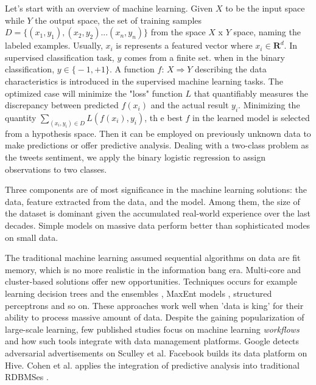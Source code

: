 \documentclass[sigconf]{acmart}
\begin{document}
Let's start with an overview of machine learning. Given $X$ to be the input space while $Y$ the output space, the set of training samples $D = \big\{ (x_1, y_1), (x_2, y_2)...(x_n, y_n) \big\} $ from the space $X$ x $Y$ space, naming the labeled examples. Usually, $x_i$ is represents a featured vector where $x_i \in \mathbf{R}^d$. In supervised classification task, $y$ comes from a finite set. when in the binary classification, $y \in \big\{ -1, +1\big\} $. A function $f$: $X \Rightarrow Y$ describing the data characteristics is introduced in the supervised machine learning tasks. The optimized case will minimize the "loss" function $L$ that quantifiably measures the discrepancy between predicted $f(x_i)$ and the actual result $y_i$. Minimizing the quantity $\sum_{(x_i, y_i) \in D} L(f(x_i), y_i)$, th e best $f$ in the learned model is selected from a hypothesis space. Then it can be employed on previously unknown data to make predictions or offer predictive analysis. \cite{christopher2016pattern} \cite{franklin2005elements} Dealing with a two-class problem as the tweets sentiment, we apply the binary logistic regression to assign observations to  two classes. 

Three components are of most significance in the machine learning solutions: the data, feature extracted from the data, and the model. Among them, the size of the dataset is dominant given the accumulated real-world experience over the last decades. \cite{halevy2009unreasonable} \cite{lin2010data} Simple models on massive data perform better than sophisticated modes on small data. \cite{banko2001scaling} \cite{brants2007large}

The traditional machine learning assumed sequential algorithms on data are fit memory, which is no more realistic in the information bang era. Multi-core \cite{chu2007map} and cluster-based solutions \cite{agarwal2014reliable} offer new opportunities. Techniques occurs for example learning decision trees and the ensembles \cite{svore2011large}, MaxEnt models \cite{mcdonald2009efficient}, structured perceptrons \cite{mcdonald2010distributed} and so on. These approaches work well when 'data is king' for their ability to process massive amount of data. Despite the gaining popularization of large-scale learning, few published studies focus on machine learning \textit{workflows} and how such tools integrate with data management platforms. Google detects adversarial advertisements on Sculley et al. \cite{sculley2011detecting} Facebook builds its data platform on Hive. \cite{thusoo2010hive} Cohen et al. applies the integration of predictive analysis into traditional RDBMSes \cite{cohen2009mad}. 
\end{document}
